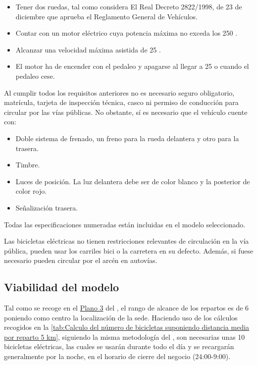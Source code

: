 \begin{itemize}
\item Tener dos ruedas, tal como considera El Real Decreto 2822/1998, de 23 de diciembre \cite{boe2822} que aprueba el Reglamento General de Vehículos.
\item Contar con un motor eléctrico cuya potencia máxima no exceda los 250 .
\item Alcanzar una velocidad máxima asistida de 25 .
\item El motor ha de encender con el pedaleo y apagarse al llegar a 25  o cuando el pedaleo cese.
\end{itemize}

Al cumplir todos los requisitos anteriores no es necesario seguro obligatorio, matrícula, tarjeta de inspección técnica, casco ni permiso de conducción para circular por las vías públicas. No obstante, sí es necesario que el vehículo cuente con:


\begin{itemize}
\item Doble sistema de frenado, un freno para la rueda delantera y otro para la trasera.
\item Timbre. 
\item Luces de posición. La luz delantera debe ser de color blanco y la posterior de color rojo.
\item Señalización trasera.
\end{itemize}

Todas las especificaciones numeradas están incluidas en el modelo seleccionado.

Las bicicletas eléctricas no tienen restricciones relevantes de circulación en la vía pública, pueden usar los carriles bici o la carretera en su defecto. Además, si fuese necesario pueden circular por el arcén en autovías.

\subsection{Viabilidad del modelo}

Tal como se recoge en el \hyperref[plano:radio]{\hyperlink{plano:radio}{Plano 3}} del , el rango de alcance de los repartos es de 6  poniendo como centro la localización de la sede. Haciendo uso de los cálculos recogidos en la \autoref{tab:Calculo del número de bicicletas suponiendo distancia media por reparto 5 km}, siguiendo la misma metodología del , son necesarias unas 10 bicicletas eléctricas, las cuales se usarán durante todo el día y se recargarán generalmente por la noche, en el horario de cierre del negocio (24:00-9:00).

